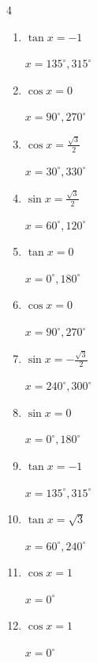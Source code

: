 \begin{multicols}{4}
\begin{enumerate}
  \item $\displaystyle \tan{x}  = -1$

        $\displaystyle x = 135^{\circ} , 315^{\circ}$

  \item $\displaystyle \cos{x}  = 0$

        $\displaystyle x = 90^{\circ} , 270^{\circ}$

  \item $\displaystyle \cos{x}  = \frac{\sqrt{3}}{2}$

        $\displaystyle x = 30^{\circ} , 330^{\circ}$

  \item $\displaystyle \sin{x}  = \frac{\sqrt{3}}{2}$

        $\displaystyle x = 60^{\circ} , 120^{\circ}$

  \item $\displaystyle \tan{x}  = 0$

        $\displaystyle x = 0^{\circ} , 180^{\circ}$

  \item $\displaystyle \cos{x}  = 0$

        $\displaystyle x = 90^{\circ} , 270^{\circ}$

  \item $\displaystyle \sin{x}  = -\frac{\sqrt{3}}{2}$

        $\displaystyle x = 240^{\circ} , 300^{\circ}$

  \item $\displaystyle \sin{x}  = 0$

        $\displaystyle x = 0^{\circ} , 180^{\circ}$

\columnbreak %

  \item $\displaystyle \tan{x}  = -1$

        $\displaystyle x = 135^{\circ} , 315^{\circ}$

  \item $\displaystyle \tan{x}  = \sqrt{3}$

        $\displaystyle x = 60^{\circ} , 240^{\circ}$

  \item $\displaystyle \cos{x}  = 1$

        $\displaystyle x = 0^{\circ}$

  \item $\displaystyle \cos{x}  = 1$

        $\displaystyle x = 0^{\circ}$


\end{enumerate}
\end{multicols}
